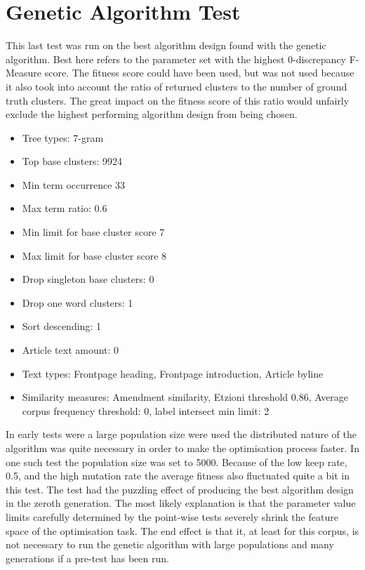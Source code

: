 \section{Genetic Algorithm Test}
This last test was run on the best algorithm design found with the genetic algorithm. Best here refers to the parameter set with the highest 0-discrepancy F-Measure score. The fitness score could have been used, but was not used because it also took into account the ratio of returned clusters to the number of ground truth clusters. The great impact on the fitness score of this ratio would unfairly exclude the highest performing algorithm design from being chosen.

\begin{itemize}
  \item Tree types: 7-gram
  \item Top base clusters: 9924
  \item Min term occurrence 33
  \item Max term ratio: 0.6
  \item Min limit for base cluster score 7
  \item Max limit for base cluster score 8
  \item Drop singleton base clusters: 0
  \item Drop one word clusters: 1
  \item Sort descending: 1
  \item Article text amount: 0
  \item Text types: Frontpage heading, Frontpage introduction, Article byline
  \item Similarity measures: Amendment similarity, Etzioni threshold 0.86, Average corpus frequency threshold: 0, label intersect min limit: 2
\end{itemize}

In early tests were a large population size were used the distributed nature of the algorithm was quite necessary in order to make the optimisation process faster. In one such test the population size was set to 5000. Because of the low keep rate, 0.5, and the high mutation rate the average fitness also fluctuated quite a bit in this test. The test had the puzzling effect of producing the best algorithm design in the zeroth generation. The most likely explanation is that the parameter value limits carefully determined by the point-wise tests severely shrink the feature space of the optimisation task. The end effect is that it, at least for this corpus, is not necessary to run the genetic algorithm with large populations and many generations if a pre-test has been run.

